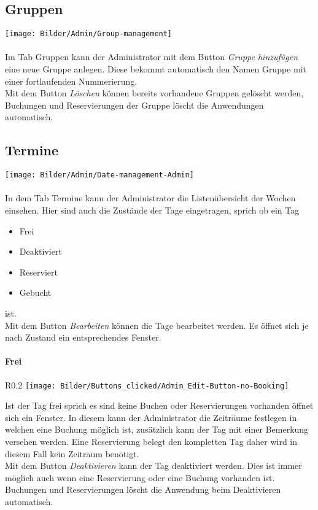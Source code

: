 \subsection{Gruppen}
	\texttt{[image: Bilder/Admin/Group-management]}
	\\
	\\	
Im Tab Gruppen kann der Administrator mit dem Button \textit{Gruppe hinzufügen} eine neue Gruppe anlegen. Diese bekommt automatisch den Namen Gruppe mit einer fortlaufenden Nummerierung.\\Mit dem Button \textit{Löschen} können bereits vorhandene Gruppen gelöscht werden, Buchungen und Reservierungen der Gruppe löscht die Anwendungen automatisch.

\subsection{Termine}
	\texttt{[image: Bilder/Admin/Date-management-Admin]}
	\\
	\\
In dem Tab Termine kann der Administrator die Listenübersicht der Wochen einsehen. Hier sind auch die Zustände der Tage eingetragen, sprich ob ein Tag
\begin{itemize}
	\item Frei 
	\item Deaktiviert 
	\item Reserviert 
	\item Gebucht
\end{itemize}
ist.
\\ Mit dem Button \textit{Bearbeiten} können die Tage bearbeitet werden. Es öffnet sich je nach Zustand ein entsprechendes Fenster.


\paragraph{Frei}
\begin{wrapfigure}{R}{0.2\textwidth}
	\centering
	\texttt{[image: Bilder/Buttons\_clicked/Admin\_Edit-Button-no-Booking]}
\end{wrapfigure}
Ist der Tag frei sprich es sind keine Buchen oder Reservierungen vorhanden öffnet sich ein Fenster. In diesem kann der Administrator die Zeiträume festlegen in welchen eine Buchung möglich ist, zusätzlich kann der Tag mit einer Bemerkung versehen werden. Eine Reservierung belegt den kompletten Tag daher wird in diesem Fall kein Zeitraum benötigt. 
\\Mit dem Button \textit{Deaktivieren} kann der Tag deaktiviert werden. Dies ist immer möglich auch wenn eine Reservierung oder eine Buchung vorhanden ist. Buchungen und Reservierungen löscht die Anwendung beim Deaktivieren automatisch.


